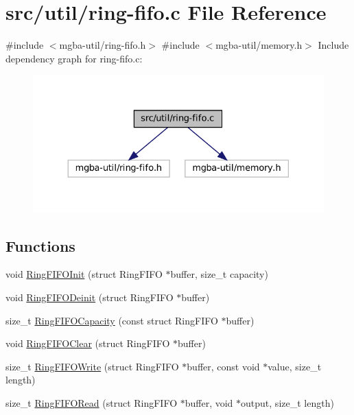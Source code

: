 \hypertarget{ring-fifo_8c}{}\section{src/util/ring-\/fifo.c File Reference}
\label{ring-fifo_8c}
{\ttfamily \#include $<$mgba-\/util/ring-\/fifo.\+h$>$}\newline
{\ttfamily \#include $<$mgba-\/util/memory.\+h$>$}\newline
Include dependency graph for ring-\/fifo.c\+:
\nopagebreak
\begin{figure}[H]
\begin{center}
\leavevmode
\includegraphics[width=330pt]{ring-fifo_8c__incl}
\end{center}
\end{figure}
\subsection*{Functions}
\begin{DoxyCompactItemize}
\item 
void \mbox{\hyperlink{ring-fifo_8c_a2dc51a008dd649da7f0ceb1db622b9c3}{Ring\+F\+I\+F\+O\+Init}} (struct Ring\+F\+I\+FO $\ast$buffer, size\+\_\+t capacity)
\item 
void \mbox{\hyperlink{ring-fifo_8c_a19b32b736d996fac60c9812e5763391d}{Ring\+F\+I\+F\+O\+Deinit}} (struct Ring\+F\+I\+FO $\ast$buffer)
\item 
size\+\_\+t \mbox{\hyperlink{ring-fifo_8c_aada2ee778e9e8656a2548a9bb34c78c3}{Ring\+F\+I\+F\+O\+Capacity}} (const struct Ring\+F\+I\+FO $\ast$buffer)
\item 
void \mbox{\hyperlink{ring-fifo_8c_ac70debb595e481d656da835e7a5a11d9}{Ring\+F\+I\+F\+O\+Clear}} (struct Ring\+F\+I\+FO $\ast$buffer)
\item 
size\+\_\+t \mbox{\hyperlink{ring-fifo_8c_a1f62d2eb6ce5d30e2b8dde832b84768a}{Ring\+F\+I\+F\+O\+Write}} (struct Ring\+F\+I\+FO $\ast$buffer, const void $\ast$value, size\+\_\+t length)
\item 
size\+\_\+t \mbox{\hyperlink{ring-fifo_8c_a77fab9449f08873c068ca91015c0a675}{Ring\+F\+I\+F\+O\+Read}} (struct Ring\+F\+I\+FO $\ast$buffer, void $\ast$output, size\+\_\+t length)
\end{DoxyCompactItemize}


